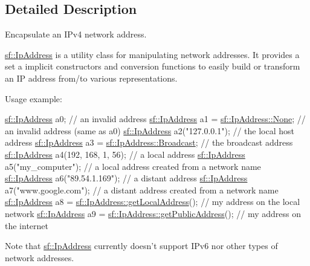 \subsection{Detailed Description}
Encapsulate an I\-Pv4 network address. 

\hyperlink{classsf_1_1_ip_address}{sf\-::\-Ip\-Address} is a utility class for manipulating network addresses. It provides a set a implicit constructors and conversion functions to easily build or transform an I\-P address from/to various representations.

Usage example\-: 
\begin{DoxyCode}
\hyperlink{classsf_1_1_ip_address}{sf::IpAddress} a0;                                     \textcolor{comment}{// an invalid address}
\hyperlink{classsf_1_1_ip_address}{sf::IpAddress} a1 = \hyperlink{classsf_1_1_ip_address_a4619b4abbe3c8fef056e7299db967404}{sf::IpAddress::None};               \textcolor{comment}{// an invalid address
       (same as a0)}
\hyperlink{classsf_1_1_ip_address}{sf::IpAddress} a2(\textcolor{stringliteral}{"127.0.0.1"});                        \textcolor{comment}{// the local host address}
\hyperlink{classsf_1_1_ip_address}{sf::IpAddress} a3 = \hyperlink{classsf_1_1_ip_address_aa93d1d57b65d243f2baf804b6035465c}{sf::IpAddress::Broadcast};          \textcolor{comment}{// the broadcast
       address}
\hyperlink{classsf_1_1_ip_address}{sf::IpAddress} a4(192, 168, 1, 56);                    \textcolor{comment}{// a local address}
\hyperlink{classsf_1_1_ip_address}{sf::IpAddress} a5(\textcolor{stringliteral}{"my\_computer"});                      \textcolor{comment}{// a local address created from a
       network name}
\hyperlink{classsf_1_1_ip_address}{sf::IpAddress} a6(\textcolor{stringliteral}{"89.54.1.169"});                      \textcolor{comment}{// a distant address}
\hyperlink{classsf_1_1_ip_address}{sf::IpAddress} a7(\textcolor{stringliteral}{"www.google.com"});                   \textcolor{comment}{// a distant address created from a
       network name}
\hyperlink{classsf_1_1_ip_address}{sf::IpAddress} a8 = \hyperlink{classsf_1_1_ip_address_a4c31622ad87edca48adbb8e8ed00ee4a}{sf::IpAddress::getLocalAddress}();  \textcolor{comment}{// my
       address on the local network}
\hyperlink{classsf_1_1_ip_address}{sf::IpAddress} a9 = \hyperlink{classsf_1_1_ip_address_a5c5cbf67e4aacf23c24f2ad991df4c55}{sf::IpAddress::getPublicAddress}(); \textcolor{comment}{// my
       address on the internet}
\end{DoxyCode}


Note that \hyperlink{classsf_1_1_ip_address}{sf\-::\-Ip\-Address} currently doesn't support I\-Pv6 nor other types of network addresses. 


